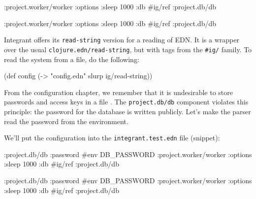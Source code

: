 \ifnarrow

\begin{english}
  \begin{clojure}
{:project.worker/worker
 {:options {:sleep 1000}
  :db #ig/ref :project.db/db}}
  \end{clojure}
\end{english}

\else

\begin{english}
  \begin{clojure}
{:project.worker/worker {:options {:sleep 1000}
                         :db #ig/ref :project.db/db}}
  \end{clojure}
\end{english}

\fi



Integrant offers its \verb|read-string| version for a reading of EDN. It is a wrapper over the usual \verb|clojure.edn/read-string|, but with tags from the \verb|#ig/| family. To read the system from a file, do the following:

\begin{english}
  \begin{clojure}
(def config
  (-> "config.edn" slurp ig/read-string))
  \end{clojure}
\end{english}


From the configuration chapter, we remember that it is undesirable to store passwords and access keys in a file . The \verb|project.db/db| component violates this principle: the password for the database is written publicly. Let's make the parser read the password from the environment.

We'll put the configuration into the \texttt{integrant\-.test.edn} file (snippet):

\ifnarrow

\begin{english}
  \begin{clojure}
{:project.db/db
 {:password #env DB_PASSWORD}
 :project.worker/worker
 {:options {:sleep 1000}
  :db #ig/ref :project.db/db}}
  \end{clojure}
\end{english}

\else

\begin{english}
  \begin{clojure}
{:project.db/db {:password #env DB_PASSWORD}
 :project.worker/worker {:options {:sleep 1000}
                         :db #ig/ref :project.db/db}}
  \end{clojure}
\end{english}

